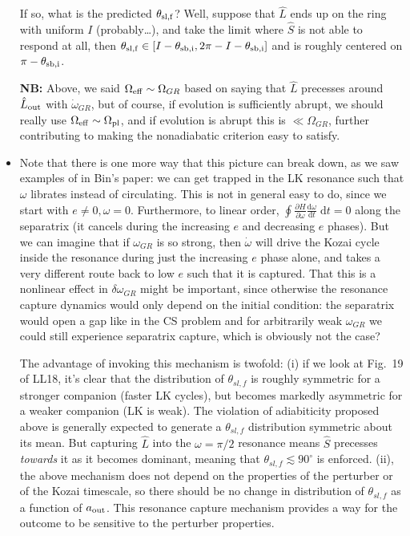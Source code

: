\documentclass[11pt,
        usenames, %
        dvipsnames %
    ]{article}
\newcommand*{\rd}[2]{\frac{\mathrm{d}#1}{\mathrm{d}#2}}
\newcommand*{\pd}[2]{\frac{\partial#1}{\partial#2}}
\newcommand*{\s}[1]{\left[#1\right]}
\begin{document}
\begin{itemize}
        If so, what is the predicted $\theta_{\rm sl, f}$? Well, suppose that
        $\hat{L}$ ends up on the ring with uniform $I$ (probably\dots), and take
        the limit where $\hat{S}$ is not able to respond at all, then
        $\theta_{\rm sl, f} \in \s{I - \theta_{\rm sb, i}, 2\pi - I -
        \theta_{\rm sb, i}}$ and is roughly centered on $\pi - \theta_{\rm sb,
        i}$.

        \textbf{NB:} Above, we said $\Omega_{\rm eff} \sim \Omega_{GR}$ based on
        saying that $\hat{L}$ precesses around $\hat{L}_{\rm out}$ with
        $\dot{\omega}_{GR}$, but of course, if evolution is sufficiently abrupt,
        we should really use $\Omega_{\rm eff} \sim \Omega_{\rm pl}$, and if
        evolution is abrupt this is $\ll \Omega_{GR}$, further contributing to
        making the nonadiabatic criterion easy to satisfy.

    \item Note that there is one more way that this picture can break down, as
        we saw examples of in Bin's paper: we can get trapped in the LK
        resonance such that $\omega$ librates instead of circulating. This is
        not in general easy to do, since we start with $e \neq 0, \omega = 0$.
        Furthermore, to linear order, $\oint
        \pd{H}{\omega}\rd{\omega}{t}\;\mathrm{d}t = 0$ along the separatrix (it
        cancels during the increasing $e$ and decreasing $e$ phases).
        But we can imagine that if $\omega_{GR}$ is so strong, then
        $\dot{\omega}$ will drive the Kozai cycle inside the resonance during
        just the increasing $e$ phase alone, and takes a very different route
        back to low $e$ such that it is captured. That this is a nonlinear
        effect in $\delta\omega_{GR}$ might be important, since otherwise the
        resonance capture dynamics would only depend on the initial condition:
        the separatrix would open a gap like in the CS problem and for
        arbitrarily weak $\omega_{GR}$ we could still experience separatrix
        capture, which is obviously not the case?

        The advantage of invoking this mechanism is twofold: (i) if we look at
        Fig.~19 of LL18, it's clear that the distribution of $\theta_{sl, f}$ is
        roughly symmetric for a stronger companion (faster LK cycles), but
        becomes markedly asymmetric for a weaker companion (LK is weak). The
        violation of adiabiticity proposed above is generally expected to
        generate a $\theta_{sl, f}$ distribution symmetric about its mean. But
        capturing $\hat{L}$ into the $\omega = \pi/2$ resonance means $\hat{S}$
        precesses \emph{towards} it as it becomes dominant, meaning that
        $\theta_{sl, f} \lesssim 90^\circ$ is enforced. (ii), the above
        mechanism does not depend on the properties of the perturber or of the
        Kozai timescale, so there should be no change in distribution of
        $\theta_{sl, f}$ as a function of $a_{\rm out}$. This resonance capture
        mechanism provides a way for the outcome to be sensitive to the
        perturber properties.
\end{itemize}
\end{document}

